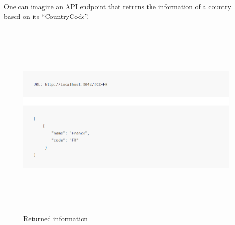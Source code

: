 \begin{itemize}
\begin{itemize}
        One can imagine an API endpoint that returns the information of a country based on its “CountryCode”.\\
        \begin{figure}[!h]
         \centering
         \includegraphics[width=\linewidth, height=10cm,keepaspectratio]{figures/ex1.PNG}
         \caption{Returned information}
        \end{figure}


\end{itemize}
\end{itemize}
